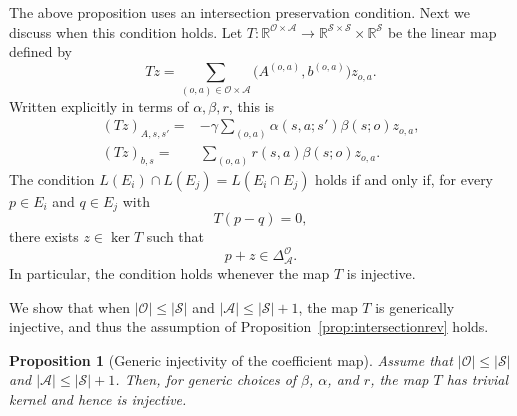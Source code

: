 \documentclass{article}
\newtheorem{proposition}[theorem]{Proposition}
\theoremstyle{definition}
\theoremstyle{remark}
\begin{document}
The above proposition uses an intersection preservation condition. Next we discuss when this condition holds. 
%
Let $T\colon \mathbb{R}^{\mathcal{O}\times\mathcal{A}} \to \mathbb{R}^{\mathcal{S}\times\mathcal{S}}\times\mathbb{R}^{\mathcal{S}}$ be the linear map defined by 
\[
Tz
=
\sum_{(o,a)\in\mathcal O\times\mathcal A}
\bigl(A^{(o,a)},b^{(o,a)}\bigr)z_{o,a} . 
\]
Written explicitly in terms of $\alpha, \beta, r$, this is 
\begin{align*} 
(Tz)_{A,s,s'} =& -\gamma\sum_{(o,a)}
\alpha(s,a;s')\beta(s;o)z_{o,a},  \\ 
(Tz)_{b,s} =& \sum_{(o,a)} r(s,a)\beta(s;o)z_{o,a}.
\end{align*} 
%
The condition $L(E_i)\cap L(E_j)=L(E_i\cap E_j)$ holds if and only if, for every $p\in E_i$ and $q\in E_j$ with
\[
T(p-q)=0,
\]
there exists \(z\in\ker T\) such that
\[
p+z\in \Delta^\mathcal O_\mathcal A.
\]
In particular, the condition holds whenever the map $T$ is injective. 

We show that when $\vert \mathcal O\vert \leq \vert \mathcal S\vert $ and $\vert \mathcal A\vert \leq \vert \mathcal S\vert +1$, the map $T$ is generically injective, and thus the assumption of Proposition~\ref{prop:intersectionrev} holds. 

\begin{proposition}[Generic injectivity of the coefficient map]

Assume that 
$\vert \mathcal O\vert \leq \vert \mathcal S\vert $ and $\vert \mathcal A\vert \leq \vert \mathcal S\vert +1$. 
%
Then, for generic choices of $\beta$, $\alpha$, and $r$, the map $T$ has trivial kernel and hence is injective. 
\end{proposition}
\end{document}
